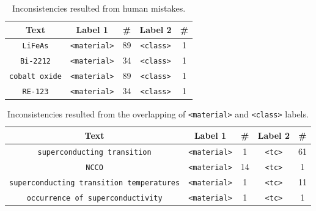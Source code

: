 \documentclass[fleqn,10pt]{wlscirep}
\begin{document}

\begin{table}[ht]
    \centering
    \begin{tabular}{ | c | c | c | c | c | } 
    \hline
        \textbf{Text} & \textbf{Label 1} & \textbf{\#} & \textbf{Label 2} & \textbf{\#}\\
    \hline
        \texttt{LiFeAs}         &   \texttt{<material>}   &    89   &   \texttt{<class>}  &   1   \\
        \texttt{Bi-2212}        &	\texttt{<material>}   &    34   &   \texttt{<class>}  &   1   \\
        \texttt{cobalt oxide}   &   \texttt{<material>}   &    89   &   \texttt{<class>}  &   1   \\
        \texttt{RE-123}         &	\texttt{<material>}   &    34   &   \texttt{<class>}  &   1   \\
    \hline
    \end{tabular}
    \caption{Inconsistencies resulted from human mistakes.}
    \label{table:dataset-inconsistencies-clear}
\end{table}


\begin{table}[ht]
    \centering
    \begin{tabular}{ | c | c | c | c | c | } 
    \hline
        \textbf{Text} & \textbf{Label 1} & \textbf{\#} & \textbf{Label 2} & \textbf{\#}\\
    \hline
        \texttt{superconducting transition}     &   \texttt{<material>}   &    1   &   \texttt{<tc>}  &   61   \\
        \texttt{NCCO}    &	\texttt{<material>}   &    14   &   \texttt{<tc>}  &   1   \\
        \texttt{superconducting transition temperatures}     &   \texttt{<material>}   &    1   &   \texttt{<tc>}  &   11   \\
        \texttt{occurrence of superconductivity}    &	\texttt{<material>}   &    1   &   \texttt{<tc>}  &   1   \\
    \hline
    \end{tabular}
    \caption{Inconsistencies resulted from the overlapping of \texttt{<material>} and \texttt{<class>} labels.}
    \label{table:dataset-inconsistencies-unclear}
\end{table}
\end{document}
